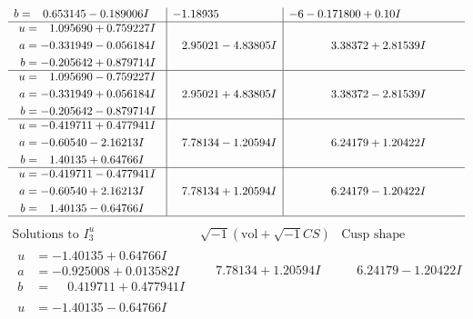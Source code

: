 \documentclass[1p]{elsarticle_modified}
\theoremstyle{definition}
\newcommand{\I}{\sqrt{-1}}
\begin{document}
$$\begin{array}{c|c|c}
\begin{aligned}
b &= \phantom{-}0.653145 - 0.189006 I\end{aligned}
 & -1.18935\phantom{ +0.000000I} &                  -6
-0.171800 + 0. 10   I\phantom{ +0.000000I} \\ \hline\begin{aligned}
u &= \phantom{-}1.095690 + 0.759227 I \\
a &= -0.331949 - 0.056184 I \\
b &= -0.205642 + 0.879714 I\end{aligned}
 & \phantom{-}2.95021 - 4.83805 I & \phantom{-}3.38372 + 2.81539 I \\ \hline\begin{aligned}
u &= \phantom{-}1.095690 - 0.759227 I \\
a &= -0.331949 + 0.056184 I \\
b &= -0.205642 - 0.879714 I\end{aligned}
 & \phantom{-}2.95021 + 4.83805 I & \phantom{-}3.38372 - 2.81539 I \\ \hline\begin{aligned}
u &= -0.419711 + 0.477941 I \\
a &= -0.60540 - 2.16213 I \\
b &= \phantom{-}1.40135 + 0.64766 I\end{aligned}
 & \phantom{-}7.78134 - 1.20594 I & \phantom{-}6.24179 + 1.20422 I \\ \hline\begin{aligned}
u &= -0.419711 - 0.477941 I \\
a &= -0.60540 + 2.16213 I \\
b &= \phantom{-}1.40135 - 0.64766 I\end{aligned}
 & \phantom{-}7.78134 + 1.20594 I & \phantom{-}6.24179 - 1.20422 I\\
 \hline 
 \end{array}$$\newpage$$\begin{array}{c|c|c}  
\text{Solutions to }I^u_{3}& \I (\text{vol} + \sqrt{-1}CS) & \text{Cusp shape}\\
 \hline 
\begin{aligned}
u &= -1.40135 + 0.64766 I \\
a &= -0.925008 + 0.013582 I \\
b &= \phantom{-}0.419711 + 0.477941 I\end{aligned}
 & \phantom{-}7.78134 + 1.20594 I & \phantom{-}6.24179 - 1.20422 I \\ \hline\begin{aligned}
u &= -1.40135 - 0.64766 I \\

\end{aligned}
\end{array}$$
\end{document}
